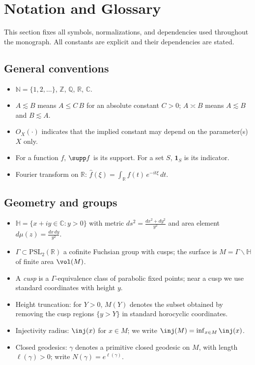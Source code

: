 \section*{Notation and Glossary}

This section fixes all symbols, normalizations, and dependencies used throughout the monograph. All constants are explicit and their dependencies are stated.

\subsection*{General conventions}
\begin{itemize}
  \item $\mathbb{N}=\{1,2,\dots\}$, $\mathbb{Z}$, $\mathbb{Q}$, $\mathbb{R}$, $\mathbb{C}$.
  \item $A\lesssim B$ means $A\le C\,B$ for an absolute constant $C>0$; $A\asymp B$ means $A\lesssim B$ and $B\lesssim A$.
  \item $O_X(\cdot)$ indicates that the implied constant may depend on the parameter(s) $X$ only.
  \item For a function $f$, $\supp f$ is its support. For a set $S$, $\mathbf{1}_S$ is its indicator.
  \item Fourier transform on $\mathbb{R}$: $\widehat{f}(\xi)=\int_{\mathbb{R}} f(t)\,e^{-i t \xi}\,dt$.
\end{itemize}

\subsection*{Geometry and groups}
\begin{itemize}
  \item $\mathbb{H}=\{x+iy\in\mathbb{C}: y>0\}$ with metric $ds^2=\frac{dx^2+dy^2}{y^2}$ and area element $d\mu(z)=\frac{dx\,dy}{y^2}$.
  \item $\Gamma\subset \mathrm{PSL}_2(\mathbb{R})$ a cofinite Fuchsian group with cusps; the surface is $M=\Gamma\backslash\mathbb{H}$ of finite area $\vol(M)$.
  \item A \emph{cusp} is a $\Gamma$-equivalence class of parabolic fixed points; near a cusp we use standard coordinates with height $y$.
  \item Height truncation: for $Y>0$, $M(Y)$ denotes the subset obtained by removing the cusp regions $\{y>Y\}$ in standard horocyclic coordinates.
  \item Injectivity radius: $\inj(x)$ for $x\in M$; we write $\inj(M)=\inf_{x\in M}\inj(x)$.
  \item Closed geodesics: $\gamma$ denotes a primitive closed geodesic on $M$, with length $\ell(\gamma)>0$; write $N(\gamma)=e^{\ell(\gamma)}$.
\end{itemize}

